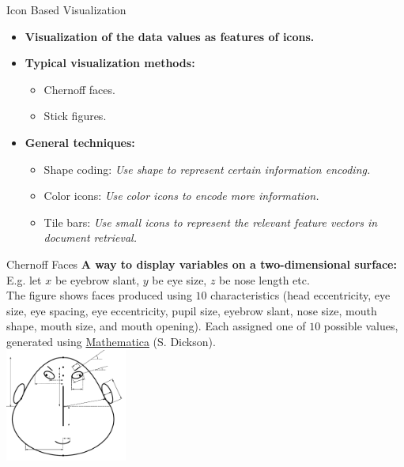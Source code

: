 \begin{frame}{Icon Based Visualization}
  \centering
  \begin{itemize}
  \item \textbf{Visualization of the data values as features of icons.}
  \item \textbf{Typical visualization methods:}
    \begin{itemize}
    \item Chernoff faces.
    \item Stick figures.
    \end{itemize}
  \item \textbf{General techniques:}
    \begin{itemize}
    \item Shape coding: \emph{Use shape to represent certain information encoding.}
    \item Color icons: \emph{Use color icons to encode more information.}
    \item Tile bars: \emph{Use small icons to represent the relevant feature vectors in document retrieval.}
    \end{itemize}
  \end{itemize}
\end{frame}

\begin{frame}{Chernoff Faces}
  \textbf{A way to display variables on a two-dimensional surface:}\\
  E.g. let $x$ be eyebrow slant, $y$ be eye size, $z$ be nose length etc.\\
  The figure shows faces produced using $10$ characteristics (head eccentricity, eye size, eye spacing, eye eccentricity, pupil size, eyebrow slant, nose size, mouth shape, mouth size, and mouth opening). Each assigned one of $10$ possible values, generated using \href{https://www.wolfram.com/mathematica/}{Mathematica} (S. Dickson).\\[0.5cm]
  \centering
  \includegraphics[width=4cm]{img/chernoff_faces_construction.pdf}
\end{frame}

